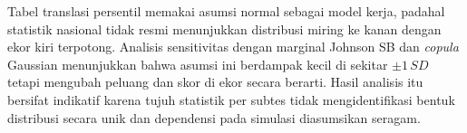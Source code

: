 Tabel translasi persentil memakai asumsi normal sebagai model kerja, padahal statistik nasional tidak resmi menunjukkan distribusi miring ke kanan dengan ekor kiri terpotong. Analisis sensitivitas dengan marginal Johnson SB dan \textit{copula} Gaussian menunjukkan bahwa asumsi ini berdampak kecil di sekitar $\pm 1\,SD$ tetapi mengubah peluang dan skor di ekor secara berarti. Hasil analisis itu bersifat indikatif karena tujuh statistik per subtes tidak mengidentifikasi bentuk distribusi secara unik dan dependensi pada simulasi diasumsikan seragam.